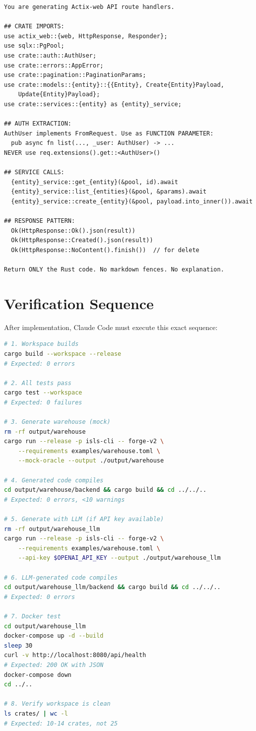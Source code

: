 \documentclass[11pt,a4paper]{article}
\begin{document}
\begin{lstlisting}[language={}]
You are generating Actix-web API route handlers.

## CRATE IMPORTS:
use actix_web::{web, HttpResponse, Responder};
use sqlx::PgPool;
use crate::auth::AuthUser;
use crate::errors::AppError;
use crate::pagination::PaginationParams;
use crate::models::{entity}::{{Entity}, Create{Entity}Payload,
    Update{Entity}Payload};
use crate::services::{entity} as {entity}_service;

## AUTH EXTRACTION:
AuthUser implements FromRequest. Use as FUNCTION PARAMETER:
  pub async fn list(..., _user: AuthUser) -> ...
NEVER use req.extensions().get::<AuthUser>()

## SERVICE CALLS:
  {entity}_service::get_{entity}(&pool, id).await
  {entity}_service::list_{entities}(&pool, &params).await
  {entity}_service::create_{entity}(&pool, payload.into_inner()).await

## RESPONSE PATTERN:
  Ok(HttpResponse::Ok().json(result))
  Ok(HttpResponse::Created().json(result))
  Ok(HttpResponse::NoContent().finish())  // for delete

Return ONLY the Rust code. No markdown fences. No explanation.
\end{lstlisting}

\section{Verification Sequence}

After implementation, Claude Code must execute this exact sequence:

\begin{lstlisting}[language=bash]
# 1. Workspace builds
cargo build --workspace --release
# Expected: 0 errors

# 2. All tests pass
cargo test --workspace
# Expected: 0 failures

# 3. Generate warehouse (mock)
rm -rf output/warehouse
cargo run --release -p isls-cli -- forge-v2 \
    --requirements examples/warehouse.toml \
    --mock-oracle --output ./output/warehouse

# 4. Generated code compiles
cd output/warehouse/backend && cargo build && cd ../../..
# Expected: 0 errors, <10 warnings

# 5. Generate with LLM (if API key available)
rm -rf output/warehouse_llm
cargo run --release -p isls-cli -- forge-v2 \
    --requirements examples/warehouse.toml \
    --api-key $OPENAI_API_KEY --output ./output/warehouse_llm

# 6. LLM-generated code compiles
cd output/warehouse_llm/backend && cargo build && cd ../../..
# Expected: 0 errors

# 7. Docker test
cd output/warehouse_llm
docker-compose up -d --build
sleep 30
curl -v http://localhost:8080/api/health
# Expected: 200 OK with JSON
docker-compose down
cd ../..

# 8. Verify workspace is clean
ls crates/ | wc -l
# Expected: 10-14 crates, not 25
\end{lstlisting}
\end{document}
